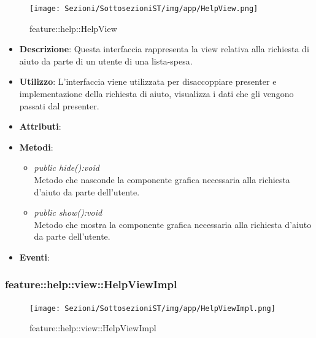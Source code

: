 \label{feature::help::HelpView}
\begin{figure}[H]
	\centering
	\texttt{[image: Sezioni/SottosezioniST/img/app/HelpView.png]}
	\caption{feature::help::HelpView}
\end{figure}

\begin{itemize}
\item \textbf{Descrizione}: Questa interfaccia rappresenta la view relativa alla richiesta di aiuto da parte di un utente di una lista-spesa.
\item \textbf{Utilizzo}: L'interfaccia viene utilizzata per disaccoppiare presenter e implementazione della richiesta di aiuto, visualizza i dati che gli vengono passati dal presenter.
\item \textbf{Attributi}:
\item \textbf{Metodi}:
	\begin{itemize}
	\item \textit{public hide():void}\\
	Metodo che nasconde la componente grafica necessaria alla richiesta d'aiuto da parte dell'utente.
	\item \textit{public show():void}\\
	Metodo che mostra la componente grafica necessaria alla richiesta d'aiuto da parte dell'utente.
	\end{itemize}
\item \textbf{Eventi}:
\end{itemize}

\subsubsection{feature::help::view::HelpViewImpl}

\label{feature::help::view::HelpViewImpl}
\begin{figure}[H]
	\centering
	\texttt{[image: Sezioni/SottosezioniST/img/app/HelpViewImpl.png]}
	\caption{feature::help::view::HelpViewImpl}
\end{figure}

